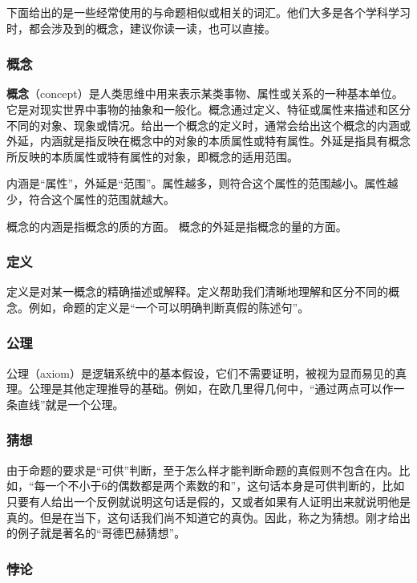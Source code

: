 下面给出的是一些经常使用的与命题相似或相关的词汇。他们大多是各个学科学习时，都会涉及到的概念，建议你读一读，也可以直接。

\subsubsection{概念}

\textbf{概念}（concept）是人类思维中用来表示某类事物、属性或关系的一种基本单位。它是对现实世界中事物的抽象和一般化。概念通过定义、特征或属性来描述和区分不同的对象、现象或情况。给出一个概念的定义时，通常会给出这个概念的内涵或外延，内涵就是指反映在概念中的对象的本质属性或特有属性。外延是指具有概念所反映的本质属性或特有属性的对象，即概念的适用范围。

内涵是“属性”，外延是“范围”。属性越多，则符合这个属性的范围越小。属性越少，符合这个属性的范围就越大。

概念的内涵是指概念的质的方面。
概念的外延是指概念的量的方面。

\subsubsection{定义}

定义是对某一概念的精确描述或解释。定义帮助我们清晰地理解和区分不同的概念。例如，命题的定义是“一个可以明确判断真假的陈述句”。

\subsubsection{公理}

公理（axiom）是逻辑系统中的基本假设，它们不需要证明，被视为显而易见的真理。公理是其他定理推导的基础。例如，在欧几里得几何中，“通过两点可以作一条直线”就是一个公理。

\subsubsection{猜想}

由于命题的要求是“可供”判断，至于怎么样才能判断命题的真假则不包含在内。比如，“每一个不小于6的偶数都是两个素数的和”，这句话本身是可供判断的，比如只要有人给出一个反例就说明这句话是假的，又或者如果有人证明出来就说明他是真的。但是在当下，这句话我们尚不知道它的真伪。因此，称之为猜想。刚才给出的例子就是著名的“哥德巴赫猜想”。

\subsubsection{悖论}


